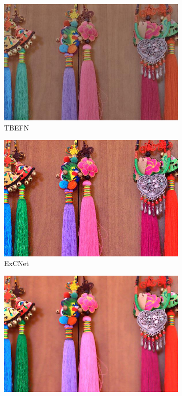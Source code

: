 \documentclass[a4paper]{ctexart}
\begin{document}
\begin{figure}[htb]
\begin{subfigure}{0.19\textwidth}
				\includegraphics[width=\linewidth]{picture/LLIE/Experiment/TBEFN1}
				\captionsetup{font=scriptsize}
				\caption{TBEFN}
				\label{fig: TBEFN1}
			\end{subfigure}
			\begin{subfigure}{0.19\textwidth}
				\includegraphics[width=\linewidth]{picture/LLIE/Experiment/ExCNet1}
				\captionsetup{font=scriptsize}
				\caption{ExCNet}
				\label{fig: ExCNet1}
			\end{subfigure}
			\begin{subfigure}{0.19\textwidth}
				\includegraphics[width=\linewidth]{picture/LLIE/Experiment/RUAS1}

\end{subfigure}
\end{figure}
\end{document}
